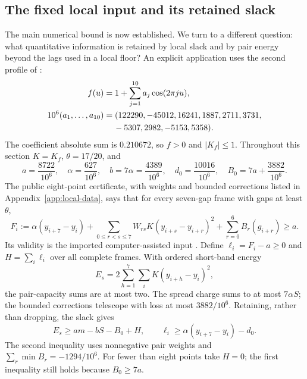 \documentclass[11pt,reqno]{amsart}
\numberwithin{equation}{section}
\begin{document}
\subsection{The fixed local input and its retained slack}

The main numerical bound is now established. We turn to a different
question: what quantitative information is retained by local slack and
by pair energy beyond the lags used in a local floor? An explicit
application uses the second profile of
\cite[Section 5]{Knausgard2026}:
\begin{equation}
 \begin{aligned}
 f(u)&=1+\sum_{j=1}^{10}a_j\cos(2\pi ju),\\
 10^6(a_1,\ldots,a_{10})&=
 (122290,-45012,16241,1887,2711,3731,\\
 &\hspace{1.2em}-5307,2982,-5153,5358).
 \end{aligned}
 \label{eq:profile-two}
\end{equation}
The coefficient absolute sum is $0.210672$, so $f>0$ and $|K_f|\le1$.
Throughout this section $K=K_f$, $\theta=17/20$, and
\begin{equation}
 a=\frac{8722}{10^6},\quad \alpha=\frac{627}{10^6},\quad
 b=7\alpha=\frac{4389}{10^6},\quad
 d_0=\frac{10016}{10^6},\quad
 B_0=7a+\frac{3882}{10^6}.
 \label{eq:base-constants}
\end{equation}
The public eight-point certificate, with weights and bounded corrections
listed in Appendix~\ref{app:local-data}, says that for every seven-gap
frame with gaps at least $\theta$,
\begin{equation}
 F_i:=\alpha(y_{i+7}-y_i)+
 \sum_{0\le r<s\le7}W_{rs}K(y_{i+s}-y_{i+r})^2
 +\sum_{r=0}^6B_r(g_{i+r})\ge a.
 \label{eq:local-floor}
\end{equation}
Its validity is the imported computer-assisted input
\cite[Proposition 5.3]{Knausgard2026}. Define
$\ell_i=F_i-a\ge0$ and $H=\sum_i\ell_i$ over all complete frames.
With ordered short-band energy
\[
 E_s=2\sum_{h=1}^7\sum_iK(y_{i+h}-y_i)^2,
\]
the pair-capacity sums are at most two. The spread charge sums to at
most $7\alpha S$; the bounded corrections telescope with loss at most
$3882/10^6$. Retaining, rather than dropping, the slack gives
\begin{equation}
 E_s\ge am-bS-B_0+H,\qquad
 \ell_i\ge\alpha(y_{i+7}-y_i)-d_0.
 \label{eq:retained-slack}
\end{equation}
The second inequality uses nonnegative pair weights and
$\sum_r\min B_r=-1294/10^6$. For fewer than eight points take
$H=0$; the first inequality still holds because $B_0\ge7a$.
\end{document}
